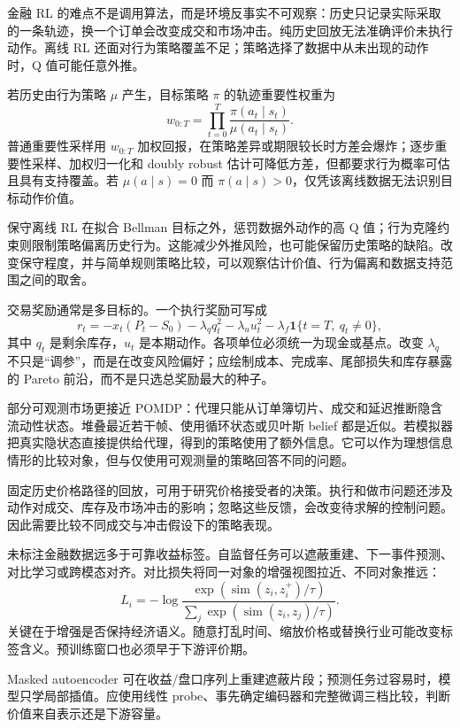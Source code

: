 金融 RL 的难点不是调用算法，而是环境反事实不可观察：历史只记录实际采取的一条轨迹，换一个订单会改变成交和市场冲击。纯历史回放无法准确评价未执行动作。离线 RL 还面对行为策略覆盖不足；策略选择了数据中从未出现的动作时，Q 值可能任意外推。

若历史由行为策略 $\mu$ 产生，目标策略 $\pi$ 的轨迹重要性权重为
\[
w_{0:T}=\prod_{t=0}^{T}
\frac{\pi(a_t\mid s_t)}{\mu(a_t\mid s_t)}.
\]
普通重要性采样用 $w_{0:T}$ 加权回报，在策略差异或期限较长时方差会爆炸；逐步重要性采样、加权归一化和 doubly robust 估计可降低方差，但都要求行为概率可估且具有支持覆盖。若 $\mu(a\mid s)=0$ 而 $\pi(a\mid s)>0$，仅凭该离线数据无法识别目标动作价值。

保守离线 RL 在拟合 Bellman 目标之外，惩罚数据外动作的高 Q 值；行为克隆约束则限制策略偏离历史行为。这能减少外推风险，也可能保留历史策略的缺陷。改变保守程度，并与简单规则策略比较，可以观察估计价值、行为偏离和数据支持范围之间的取舍。

交易奖励通常是多目标的。一个执行奖励可写成
\[
r_t=-x_t(P_t-S_0)-\lambda_q q_t^2-\lambda_u u_t^2
-\lambda_f\mathbf 1\{t=T,\ q_t\ne0\},
\]
其中 $q_t$ 是剩余库存，$u_t$ 是本期动作。各项单位必须统一为现金或基点。改变 $\lambda_q$ 不只是“调参”，而是在改变风险偏好；应绘制成本、完成率、尾部损失和库存暴露的 Pareto 前沿，而不是只选总奖励最大的种子。

部分可观测市场更接近 POMDP：代理只能从订单簿切片、成交和延迟推断隐含流动性状态。堆叠最近若干帧、使用循环状态或贝叶斯 belief 都是近似。若模拟器把真实隐状态直接提供给代理，得到的策略使用了额外信息。它可以作为理想信息情形的比较对象，但与仅使用可观测量的策略回答不同的问题。

\begin{diagnostic}
固定历史价格路径的回放，可用于研究价格接受者的决策。执行和做市问题还涉及动作对成交、库存及市场冲击的影响；忽略这些反馈，会改变待求解的控制问题。因此需要比较不同成交与冲击假设下的策略表现。
\end{diagnostic}


未标注金融数据远多于可靠收益标签。自监督任务可以遮蔽重建、下一事件预测、对比学习或跨模态对齐。对比损失将同一对象的增强视图拉近、不同对象推远：
\[
L_i=-\log\frac{\exp(\operatorname{sim}(z_i,z_i^+)/\tau)}
{\sum_j\exp(\operatorname{sim}(z_i,z_j)/\tau)}.
\]
关键在于增强是否保持经济语义。随意打乱时间、缩放价格或替换行业可能改变标签含义。预训练窗口也必须早于下游评价期。

Masked autoencoder 可在收益/盘口序列上重建遮蔽片段；预测任务过容易时，模型只学局部插值。应使用线性 probe、事先确定编码器和完整微调三档比较，判断价值来自表示还是下游容量。

